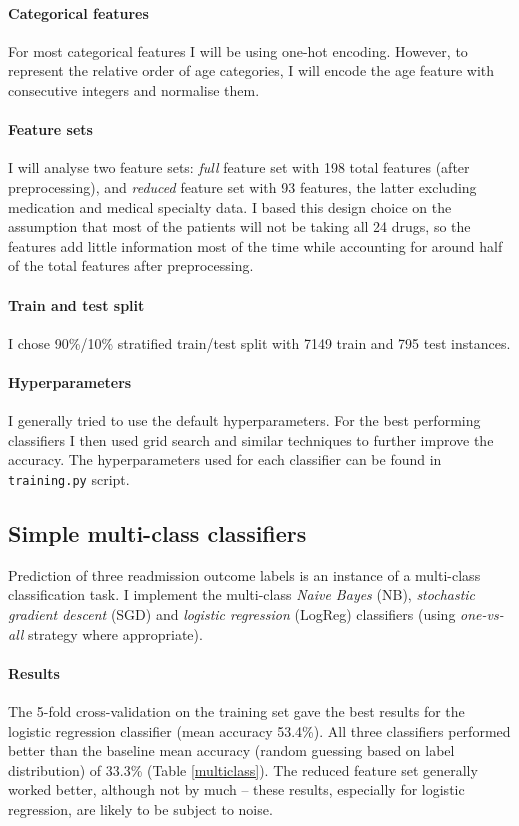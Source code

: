 \documentclass[10pt, twocolumn]{article}
\begin{document}
\paragraph{Categorical features} For most categorical features I will be using one-hot encoding. However, to represent the relative order of age categories, I will encode the age feature with consecutive integers and normalise them.

\paragraph{Feature sets} I will analyse two feature sets: \textit{full} feature set with 198 total features (after preprocessing), and \textit{reduced} feature set with 93 features, the latter excluding medication and medical specialty data. I based this design choice on the assumption that most of the patients will not be taking all 24 drugs, so the features add little information most of the time while accounting for around half of the total features after preprocessing.

\paragraph{Train and test split} I chose 90\%/10\% stratified train/test split with 7149 train and 795 test instances.

\paragraph{Hyperparameters} I generally tried to use the default hyperparameters. For the best performing classifiers I then used grid search and similar techniques to further improve the accuracy. The hyperparameters used for each classifier can be found in \texttt{training.py} script.

\subsection{Simple multi-class classifiers}
Prediction of three readmission outcome labels is an instance of a multi-class classification task. I implement the multi-class \textit{Naive Bayes} (NB), \textit{stochastic gradient descent} (SGD) and \textit{logistic regression}  (LogReg) classifiers (using \textit{one-vs-all} strategy where appropriate).

\paragraph{Results} The 5-fold cross-validation on the training set gave the best results for the logistic regression classifier (mean accuracy 53.4\%). All three classifiers performed better than the baseline mean accuracy (random guessing based on label distribution) of 33.3\% (Table \ref{multiclass}). The reduced feature set generally worked better, although not by much – these results, especially for logistic regression, are likely to be subject to noise.
\end{document}
